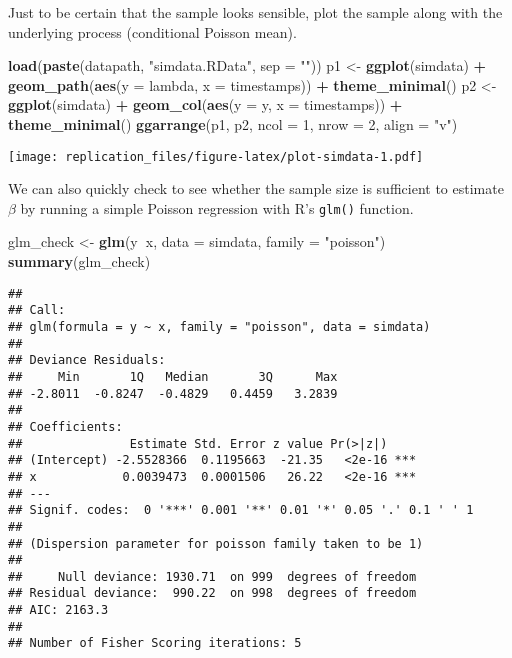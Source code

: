 \documentclass[]{article}
\newenvironment{Shaded}{\begin{snugshade}}{\end{snugshade}}
\newcommand{\KeywordTok}[1]{\textcolor[rgb]{0.13,0.29,0.53}{\textbf{#1}}}
\newcommand{\DataTypeTok}[1]{\textcolor[rgb]{0.13,0.29,0.53}{#1}}
\newcommand{\DecValTok}[1]{\textcolor[rgb]{0.00,0.00,0.81}{#1}}
\newcommand{\StringTok}[1]{\textcolor[rgb]{0.31,0.60,0.02}{#1}}
\newcommand{\OperatorTok}[1]{\textcolor[rgb]{0.81,0.36,0.00}{\textbf{#1}}}
\newcommand{\NormalTok}[1]{#1}
\begin{document}
Just to be certain that the sample looks sensible, plot the sample along
with the underlying process (conditional Poisson mean).

\begin{Shaded}
\begin{Highlighting}[]
\KeywordTok{load}\NormalTok{(}\KeywordTok{paste}\NormalTok{(datapath,}
            \StringTok{"simdata.RData"}\NormalTok{,}
            \DataTypeTok{sep =} \StringTok{""}\NormalTok{))}
\NormalTok{p1 <-}\StringTok{ }\KeywordTok{ggplot}\NormalTok{(simdata) }\OperatorTok{+}
\StringTok{            }\KeywordTok{geom_path}\NormalTok{(}\KeywordTok{aes}\NormalTok{(}\DataTypeTok{y =}\NormalTok{ lambda, }\DataTypeTok{x =}\NormalTok{ timestamps)) }\OperatorTok{+}
\StringTok{            }\KeywordTok{theme_minimal}\NormalTok{()}
\NormalTok{p2 <-}\StringTok{ }\KeywordTok{ggplot}\NormalTok{(simdata) }\OperatorTok{+}
\StringTok{            }\KeywordTok{geom_col}\NormalTok{(}\KeywordTok{aes}\NormalTok{(}\DataTypeTok{y =}\NormalTok{ y, }\DataTypeTok{x =}\NormalTok{ timestamps)) }\OperatorTok{+}
\StringTok{            }\KeywordTok{theme_minimal}\NormalTok{()}
\KeywordTok{ggarrange}\NormalTok{(p1,}
\NormalTok{        p2,}
        \DataTypeTok{ncol =} \DecValTok{1}\NormalTok{,}
        \DataTypeTok{nrow =} \DecValTok{2}\NormalTok{,}
        \DataTypeTok{align =} \StringTok{"v"}\NormalTok{)}
\end{Highlighting}
\end{Shaded}

\texttt{[image: replication\_files/figure-latex/plot-simdata-1.pdf]}

We can also quickly check to see whether the sample size is sufficient
to estimate \(\beta\) by running a simple Poisson regression with R's
\texttt{glm()} function.

\begin{Shaded}
\begin{Highlighting}[]
\NormalTok{glm_check <-}\StringTok{ }\KeywordTok{glm}\NormalTok{(y}\OperatorTok{~}\NormalTok{x,}
                \DataTypeTok{data =}\NormalTok{ simdata,}
                \DataTypeTok{family =} \StringTok{"poisson"}\NormalTok{)}
\KeywordTok{summary}\NormalTok{(glm_check)}
\end{Highlighting}
\end{Shaded}

\begin{verbatim}
## 
## Call:
## glm(formula = y ~ x, family = "poisson", data = simdata)
## 
## Deviance Residuals: 
##     Min       1Q   Median       3Q      Max  
## -2.8011  -0.8247  -0.4829   0.4459   3.2839  
## 
## Coefficients:
##               Estimate Std. Error z value Pr(>|z|)    
## (Intercept) -2.5528366  0.1195663  -21.35   <2e-16 ***
## x            0.0039473  0.0001506   26.22   <2e-16 ***
## ---
## Signif. codes:  0 '***' 0.001 '**' 0.01 '*' 0.05 '.' 0.1 ' ' 1
## 
## (Dispersion parameter for poisson family taken to be 1)
## 
##     Null deviance: 1930.71  on 999  degrees of freedom
## Residual deviance:  990.22  on 998  degrees of freedom
## AIC: 2163.3
## 
## Number of Fisher Scoring iterations: 5
\end{verbatim}
\end{document}
